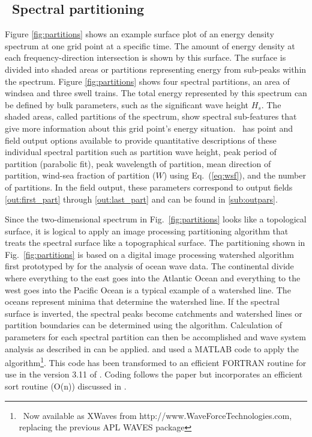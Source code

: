 \vssub
\subsection{~Spectral partitioning} \label{sub:num_part}

\noindent
Figure \ref{fig:partitions} shows an example surface plot of an energy density
spectrum at one grid point at a specific time.  The amount of energy density
at each frequency-direction intersection is shown by this surface.  The
surface is divided into shaded areas or partitions representing energy from
sub-peaks within the spectrum.  Figure \ref{fig:partitions} shows four
spectral partitions, an area of windsea and three swell trains.  The total
energy represented by this spectrum can be defined by bulk parameters, such as
the significant wave height $H_s$. The shaded areas, called partitions of the
spectrum, show spectral sub-features that give more information about this
grid point's energy situation.  \ws\ has point and field output options
available to provide quantitative descriptions of these individual spectral
partition such as partition wave height, peak period of partition (parabolic
fit), peak wavelength of partition, mean direction of partition, wind-sea
fraction of partition ($W$) using Eq.~(\ref{eq:wsf}), and the number of
partitions.  In the field output, these parameters correspond to output fields
\ref{out:first_part} through \ref{out:last_part} and can be found in
\para\ref{sub:outpars}.

Since the two-dimensional spectrum in Fig.~\ref{fig:partitions} looks like a
topological surface, it is logical to apply an image processing partitioning
algorithm that treats the spectral surface like a topographical surface.  The
partitioning shown in Fig.~\ref{fig:partitions} is based on a digital image
processing watershed algorithm \citep{art:VS91} first prototyped by
\cite{pro:HJ04} for the analysis of ocean wave data. 
The continental divide where everything to the east goes into the Atlantic
Ocean and everything to the west goes into the Pacific Ocean is a typical
example of a watershed line.  The oceans represent minima that determine the
watershed line.  If the spectral surface is inverted, the spectral peaks
become catchments and watershed lines or partition boundaries can be
determined using the \cite{art:VS91} algorithm.  Calculation of parameters for
each spectral partition can then be accomplished and wave system analysis as
described in \cite{art:HP01} can be applied.  \cite{pro:HJ04} and
\cite{tol:Vict06b} used a MATLAB code to apply the \cite{art:VS91}
algorithm\footnote{~Now available as XWaves from
http://www.WaveForceTechnologies.com, replacing the previous APL WAVES
package}.  This code has been transformed to an efficient FORTRAN routine for
use in the version 3.11 of \ws.  Coding follows the
\cite{art:VS91} paper but incorporates an efficient sort routine (O(n))
discussed in \cite{rep:TTH06}.

